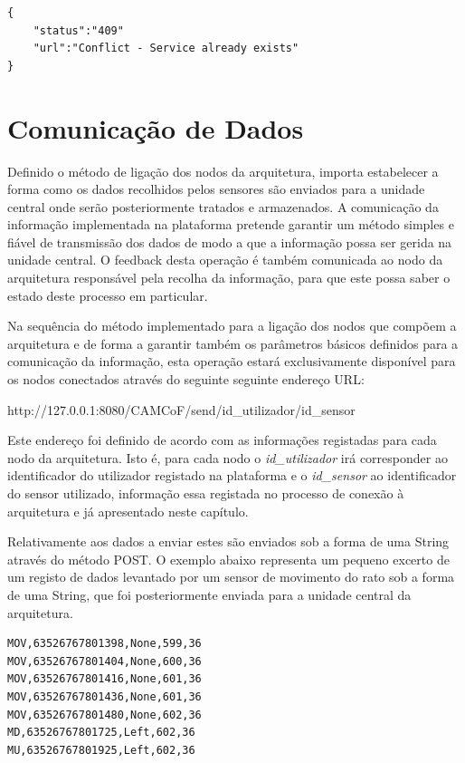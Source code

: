 \begin{lstlisting}[caption=Mensagem de conflito em JSON]
{
	"status":"409"
	"url":"Conflict - Service already exists"
}
\end{lstlisting}


\section{Comunicação de Dados}

Definido o método de ligação dos nodos da arquitetura, importa estabelecer a forma como os dados recolhidos pelos sensores são enviados para a unidade central onde serão posteriormente tratados e armazenados. A comunicação da informação implementada na plataforma pretende garantir um método simples e fiável de transmissão dos dados de modo a que a informação possa ser gerida na unidade central. O feedback desta operação é também comunicada ao nodo da arquitetura responsável pela recolha da informação, para que este possa saber o estado deste processo em particular.

Na sequência do método implementado para a ligação dos nodos que compõem a arquitetura e de forma a garantir também os parâmetros básicos definidos para a comunicação da informação, esta operação estará exclusivamente disponível para os nodos conectados através do seguinte seguinte endereço URL:

http://127.0.0.1:8080/CAMCoF/send/id\_utilizador/id\_sensor

Este endereço foi definido de acordo com as informações registadas para cada nodo da arquitetura. Isto é, para cada nodo o \textit{id\_utilizador} irá corresponder ao identificador do utilizador registado na plataforma e o \textit{id\_sensor} ao identificador do sensor utilizado, informação essa registada no processo de conexão à arquitetura e já apresentado neste capítulo.

Relativamente aos dados a enviar estes são enviados sob a forma de uma String através do método POST. O exemplo abaixo representa um pequeno excerto de um registo de dados levantado por um sensor de movimento do rato sob a forma de uma String, que foi posteriormente enviada para a unidade central da arquitetura.\\
\begin{lstlisting}[caption=Excerto de dados levantado por sensor de movimento de rato]
MOV,63526767801398,None,599,36
MOV,63526767801404,None,600,36
MOV,63526767801416,None,601,36
MOV,63526767801436,None,601,36
MOV,63526767801480,None,602,36
MD,63526767801725,Left,602,36
MU,63526767801925,Left,602,36
\end{lstlisting}



